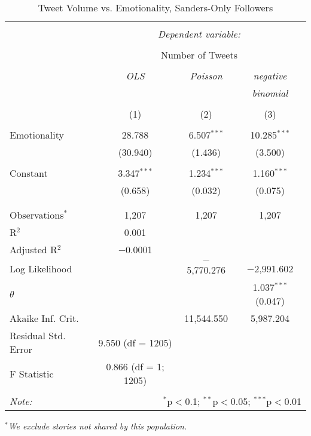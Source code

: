 \begin{table}[!htbp] \centering 
  \caption{Tweet Volume vs. Emotionality, Sanders-Only Followers} 
  \label{} 
    \begin{tabular}{@{\extracolsep{5pt}}lccc} 
    \\[-1.8ex]\hline 
    \hline \\[-1.8ex] 
     & \multicolumn{3}{c}{\textit{Dependent variable:}} \\ 
    \cline{2-4} 
    \\[-1.8ex] & \multicolumn{3}{c}{Number of Tweets} \\ 
    \\[-1.8ex] & \textit{OLS} & \textit{Poisson} & \textit{negative} \\ 
     & \textit{} & \textit{} & \textit{binomial} \\ 
    \\[-1.8ex] & (1) & (2) & (3)\\ 
    \hline \\[-1.8ex] 
     Emotionality & 28.788 & 6.507$^{***}$ & 10.285$^{***}$ \\ 
      & (30.940) & (1.436) & (3.500) \\ 
      & & & \\ 
     Constant & 3.347$^{***}$ & 1.234$^{***}$ & 1.160$^{***}$ \\ 
      & (0.658) & (0.032) & (0.075) \\ 
      & & & \\ 
    \hline \\[-1.8ex] 
    Observations$^{*}$ & 1,207 & 1,207 & 1,207 \\ 
    R$^{2}$ & 0.001 &  &  \\ 
    Adjusted R$^{2}$ & $-$0.0001 &  &  \\ 
    Log Likelihood &  & $-$5,770.276 & $-$2,991.602 \\ 
    $\theta$ &  &  & 1.037$^{***}$  (0.047) \\ 
    Akaike Inf. Crit. &  & 11,544.550 & 5,987.204 \\ 
    Residual Std. Error & 9.550 (df = 1205) &  &  \\ 
    F Statistic & 0.866 (df = 1; 1205) &  &  \\ 
    \hline 
    \hline \\[-1.8ex] 
    \textit{Note:}  & \multicolumn{3}{r}{$^{*}$p$<$0.1; $^{**}$p$<$0.05; $^{***}$p$<$0.01} \\ 
    \end{tabular} 
\end{table}
\emph{$^{*}$We exclude stories not shared by this population.} 
\newpage 



